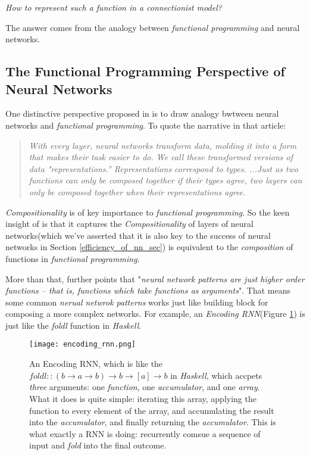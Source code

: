 \documentclass[letterpaper,10pt]{article}
\theoremstyle{definition}
\begin{document}
\begin{center}	
\emph{How to represent such a function in a connectionist model?}
\end{center}

The answer comes from the analogy between \emph{functional programming} and neural networks.

\subsection{The Functional Programming Perspective of Neural Networks}

One distinctive perspective proposed in \cite{olah2015neural} is to draw analogy bwtween neural networks and \emph{functional programming}. To quote the narrative in that article:

\begin{quote}	
\emph{With every layer, neural networks transform data, molding it into a form that makes their task easier to do. We call these transformed versions of data "representations.” Representations correspond to types. ...Just as two functions can only be composed together if their types agree, two layers can only be
composed together when their representations agree.}
\end{quote}

\emph{Compositionality} is of key importance to \emph{functional programming}\cite{hughes1989functional}. So the keen insight of  \cite{olah2015neural} is that
it captures the \emph{Compositionality} of layers of neural networks(which we've asserted that it is also key to the success of neural networks in Section \ref{efficiency_of_nn_sec}) is equivalent to the \emph{composition} of functions in \emph{functional programming}.

More than that, \cite{olah2015neural} further points that "\emph{neural network patterns are just higher order functions – that is, functions which take functions as arguments}". That means some common \emph{nerual netwrok patterns} works just like building block for composing a more complex networks. For example, an \emph{Encoding RNN}(Figure \ref{fig:encoding_rnn}) is just like the \emph{foldl} function in \emph{Haskell}.

\begin{figure}[h]
\centering
\texttt{[image: encoding\_rnn.png]}
\caption{An Encoding RNN, which is like the $foldl :: (b \rightarrow a \rightarrow b) \rightarrow b \rightarrow [a] \rightarrow b$ in \emph{Haskell}, which accpets \emph{three} arguments:  one \emph{function}, one \emph{accumulator}, and one \emph{array}. What it does is quite simple: iterating this array, applying the function to every element of the array, and accumulating the result into the \emph{accumulator}, and finally returning the \emph{accumulator}. This is what exactly a RNN is doing: recurrently comsue a sequence of input and \emph{fold} into the final outcome. }
\label{fig:encoding_rnn}
\end{figure}
\end{document}
